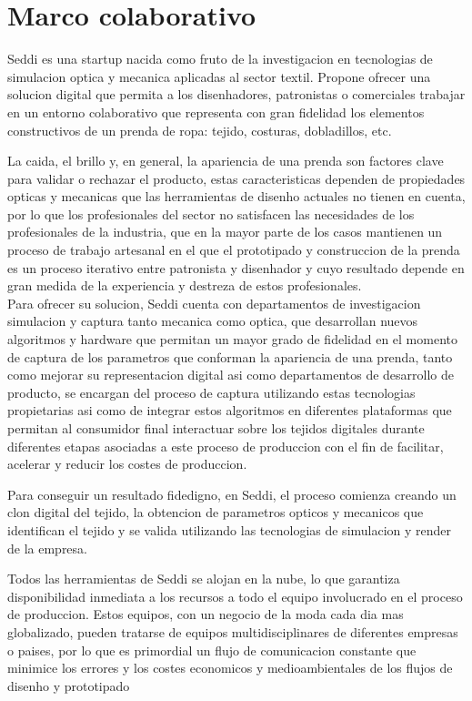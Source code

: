 \chapter{Marco colaborativo}
Seddi es una startup nacida como fruto de la investigacion en tecnologias de simulacion optica y mecanica aplicadas al sector textil.
Propone ofrecer una solucion digital que permita a los disenhadores, patronistas o comerciales trabajar en un entorno colaborativo que
representa con gran fidelidad los elementos constructivos de un prenda de ropa: tejido, costuras, dobladillos, etc.

La caida, el brillo y, en general, la apariencia de una prenda son factores clave para validar o rechazar el producto, estas caracteristicas
dependen de propiedades opticas y mecanicas que las herramientas de disenho actuales no tienen en cuenta, por lo que los profesionales del
sector no satisfacen las necesidades de los profesionales de la industria, que en la mayor parte de los casos mantienen un proceso de
trabajo artesanal en el que el prototipado y construccion de la prenda es un proceso iterativo entre patronista y disenhador y cuyo
resultado depende en gran medida de la experiencia y destreza de estos profesionales.\\

Para ofrecer su solucion, Seddi cuenta con departamentos de investigacion simulacion y captura tanto mecanica como optica, que desarrollan
nuevos algoritmos y hardware que permitan un mayor grado de fidelidad en el momento de captura de los parametros que conforman la apariencia
de una prenda, tanto como mejorar su representacion digital asi como departamentos de desarrollo de producto, se encargan del proceso de
captura utilizando estas tecnologias propietarias asi como de integrar estos algoritmos en diferentes plataformas que permitan al consumidor
final interactuar sobre los tejidos digitales durante diferentes etapas asociadas a este proceso de produccion con el fin de facilitar,
acelerar y reducir los costes de produccion.

Para conseguir un resultado fidedigno, en Seddi, el proceso comienza creando un clon digital del tejido, la obtencion de parametros opticos y
mecanicos que identifican el tejido y se valida utilizando las tecnologias de simulacion y render de la empresa. 

Todos las herramientas de Seddi se alojan en la nube, lo que garantiza disponibilidad inmediata a los recursos a todo el equipo involucrado en
el proceso de produccion. Estos equipos, con un negocio de la moda cada dia mas globalizado, pueden tratarse de equipos multidisciplinares de
diferentes empresas o paises, por lo que es primordial un flujo de comunicacion constante que minimice los errores y los costes economicos y
medioambientales de los flujos de disenho y prototipado


